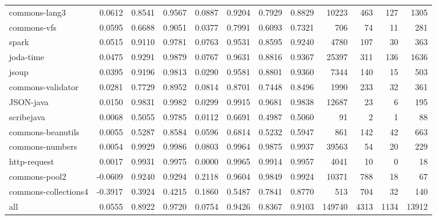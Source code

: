 \begin{table*}
\begin{tabular}{lrrrrrrrrrrr}
          commons-lang3 &      0.0612 &  0.8541 &     0.9567 &     0.0887 &  0.9204 &     0.7929 &   0.8829 &   10223 &   463 &   127 &   1305 \\
            commons-vfs &      0.0595 &  0.6688 &     0.9051 &     0.0377 &  0.7991 &     0.6093 &   0.7321 &     706 &    74 &    11 &    281 \\
                  spark &      0.0515 &  0.9110 &     0.9781 &     0.0763 &  0.9531 &     0.8595 &   0.9240 &    4780 &   107 &    30 &    363 \\
              joda-time &      0.0475 &  0.9291 &     0.9879 &     0.0767 &  0.9631 &     0.8816 &   0.9367 &   25397 &   311 &   136 &   1636 \\
                  jsoup &      0.0395 &  0.9196 &     0.9813 &     0.0290 &  0.9581 &     0.8801 &   0.9360 &    7344 &   140 &    15 &    503 \\
      commons-validator &      0.0281 &  0.7729 &     0.8952 &     0.0814 &  0.8701 &     0.7448 &   0.8496 &    1990 &   233 &    32 &    361 \\
              JSON-java &      0.0150 &  0.9831 &     0.9982 &     0.0299 &  0.9915 &     0.9681 &   0.9838 &   12687 &    23 &     6 &    195 \\
             scribejava &      0.0068 &  0.5055 &     0.9785 &     0.0112 &  0.6691 &     0.4987 &   0.5060 &      91 &     2 &     1 &     88 \\
      commons-beanutils &      0.0055 &  0.5287 &     0.8584 &     0.0596 &  0.6814 &     0.5232 &   0.5947 &     861 &   142 &    42 &    663 \\
        commons-numbers &      0.0054 &  0.9929 &     0.9986 &     0.0803 &  0.9964 &     0.9875 &   0.9937 &   39563 &    54 &    20 &    229 \\
           http-request &      0.0017 &  0.9931 &     0.9975 &     0.0000 &  0.9965 &     0.9914 &   0.9957 &    4041 &    10 &     0 &     18 \\
          commons-pool2 &     -0.0609 &  0.9240 &     0.9294 &     0.2118 &  0.9604 &     0.9849 &   0.9924 &   10371 &   788 &    18 &     67 \\
   commons-collections4 &     -0.3917 &  0.3924 &     0.4215 &     0.1860 &  0.5487 &     0.7841 &   0.8770 &     513 &   704 &    32 &    140 \\
                    all &      0.0555 &  0.8922 &     0.9720 &     0.0754 &  0.9426 &     0.8367 &   0.9103 &  149740 &  4313 &  1134 &  13912 \\
\bottomrule
\end{tabular}
\end{table*}
